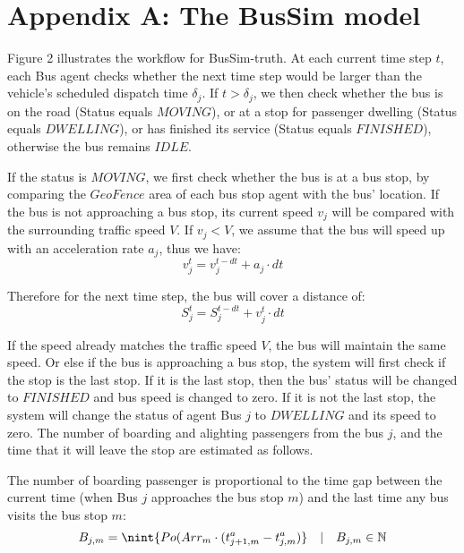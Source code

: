 \section*{Appendix A: The BusSim model \label{appendix:BusSim}}

Figure 2 illustrates the workflow for BusSim-truth. At each current time step $t$, each Bus agent checks whether the next time step would be larger than the vehicle's scheduled dispatch time $\delta_j$. If $t>\delta_j$, we then check whether the bus is on the road (Status equals $MOVING$), or at a stop for passenger dwelling (Status equals $DWELLING$), or has finished its service (Status equals $FINISHED$), otherwise the bus remains $IDLE$. 

If the status is $MOVING$, we first check whether the bus is at a bus stop, by comparing the $GeoFence$ area of each bus stop agent with the bus' location. If the bus is not approaching a bus stop, its current speed $v_j$ will be compared with the surrounding traffic speed $V$. If $v_j<V$, we assume that the bus will speed up with an acceleration rate $a_j$, thus we have: 
\begin{equation}
v_j^{t} = v_j^{t-dt} + a_j \cdot dt
\end{equation}

Therefore for the next time step, the bus will cover a distance of: 
\begin{equation}
S_j^t = S_j^{t-dt} + v_j^t \cdot dt
\end{equation}

If the speed already matches the traffic speed $V$, the bus will maintain the same speed. Or else if the bus is approaching a bus stop, the system will first check if the stop is the last stop. If it is the last stop, then the bus' status will be changed to $FINISHED$ and bus speed is changed to zero. If it is not the last stop, the system will change the status of agent Bus $j$ to $DWELLING$ and its speed to zero. The number of boarding and alighting passengers from the bus $j$, and the time that it will leave the stop are estimated as follows.  

The number of boarding passenger is proportional to the time gap between the current time (when Bus $j$ approaches the bus stop $m$) and the last time any bus visits the bus stop $m$:     
\begin{equation}
B_{j,m} = \nint{Po(Arr_m \cdot (t^a_{j+1,m}-t^a_{j,m}) } \quad | \quad B_{j,m}\in\mathbb{N}
\label{eq:Boarding_est}
\end{equation}

